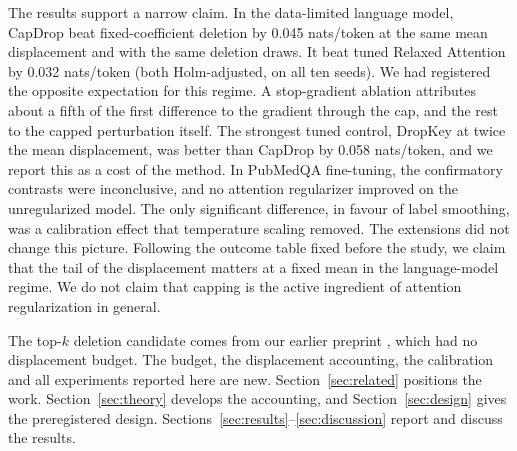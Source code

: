 The results support a narrow claim. In the data-limited language model, CapDrop beat fixed-coefficient deletion by
0.045 nats/token at the same mean displacement and with the same deletion draws. It beat tuned Relaxed Attention by 0.032 nats/token
(both Holm-adjusted, on all ten seeds). We had registered the opposite expectation for this regime. A
stop-gradient ablation attributes about a fifth of the first difference to the gradient through the cap, and the
rest to the capped perturbation itself. The strongest tuned control, DropKey at twice the mean displacement, was better
than CapDrop by 0.058 nats/token, and we report this as a cost of the method. In PubMedQA fine-tuning, the
confirmatory contrasts were inconclusive, and no attention regularizer improved on the unregularized model. The only
significant difference, in favour of label smoothing, was a calibration effect that temperature scaling removed. The extensions did not
change this picture. Following the outcome table fixed before the study, we claim that the tail of the displacement
matters at a fixed mean in the language-model regime. We do not claim that capping is the active ingredient of
attention regularization in general.

The top-$k$ deletion candidate comes from our earlier preprint \citep{baig2025attentiondrop}, which had no
displacement budget. The budget, the displacement accounting, the calibration and all experiments reported
here are new. Section~\ref{sec:related} positions the work. Section~\ref{sec:theory} develops the accounting,
and Section~\ref{sec:design} gives the preregistered design. Sections~\ref{sec:results}--\ref{sec:discussion}
report and discuss the results.
